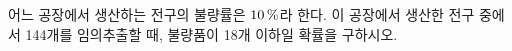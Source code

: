 어느 공장에서 생산하는 전구의 불량률은 $10\mkern3mu \%$라 한다. 이 공장에서 생산한 전구 중에서 144개를 임의추출할 때, 불량품이 18개 이하일 확률을 구하시오. 
